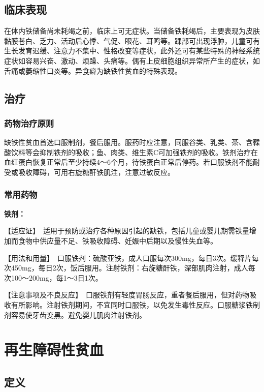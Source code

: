 \subsection{临床表现}

在体内铁储备尚未耗竭之前，临床上可无症状。当储备铁耗竭后，主要表现为皮肤黏膜苍白、乏力、活动后心悸、气促、眼花、耳鸣等。踝部可出现浮肿，儿童可有生长发育迟缓、注意力不集中、性格改变等症状，此外还可有某些特殊的神经系统症状如容易兴奋、激动、烦躁、头痛等。偶有上皮细胞组织异常所产生的症状，如舌痛或萎缩性口炎等。异食癖为缺铁性贫血的特殊表现。

\subsection{治疗}

\subsubsection{药物治疗原则}

缺铁性贫血首选口服制剂，餐后服用。服药时应注意，同服谷类、乳类、茶、含鞣酸饮料等会抑制铁剂的吸收；鱼、肉类、维生素C可加强铁剂的吸收。铁剂治疗在血红蛋白恢复正常后至少持续4～6个月，待铁蛋白正常后停药。若口服铁剂不能耐受或吸收障碍，可用右旋糖酐铁肌注，注意过敏反应。

\subsubsection{常用药物}

\textbf{铁剂：}

【适应证】　适用于预防或治疗各种原因引起的缺铁，包括儿童或婴儿期需铁量增加而食物中供应量不足、铁吸收障碍、妊娠中后期以及慢性失血等。

【用法和用量】　口服铁剂：硫酸亚铁，成人口服每次300mg，每日3次。缓释片每次450mg，每日2次，饭后服用。注射铁剂：右旋糖酐铁，深部肌肉注射，成人每次100～200mg，每1～3日1次。

【注意事项及不良反应】　口服铁剂有轻度胃肠反应，重者餐后服用，但对药物吸收有所影响。注射铁剂期间，不宜同时口服铁，以免发生毒性反应。口服糖浆铁制剂容易使牙齿变黑。避免婴儿肌肉注射铁剂。

\section{再生障碍性贫血}

\subsection{定义}

